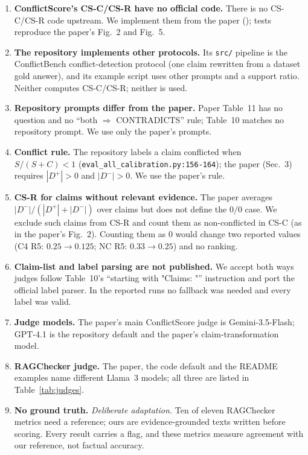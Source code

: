 \documentclass[11pt,a4paper]{article}
\newcommand{\code}[1]{\texttt{\detokenize{#1}}}
\DeclareRobustCommand{\src}[1]{{\small\nolinkurl{#1}}}
\begin{document}
\begin{enumerate}[label=\textbf{D\arabic*}, ref=D\arabic*, leftmargin=2.2em]
\item\label{d:cs-names} \textbf{ConflictScore's CS-C/CS-R have no official code.} There is no CS-C/CS-R code upstream. We implement them from the paper (\code{published_cs}); tests reproduce the paper's Fig.~2 and Fig.~5.
\item\label{d:cs-protocol} \textbf{The repository implements other protocols.} Its \src{src/} pipeline is the ConflictBench conflict-detection protocol (one claim rewritten from a dataset gold answer), and its example script uses other prompts and a support ratio. Neither computes CS-C/CS-R; neither is used.
\item\label{d:cs-prompts} \textbf{Repository prompts differ from the paper.} Paper Table~11 has no question and no ``both $\Rightarrow$ CONTRADICTS'' rule; Table~10 matches no repository prompt. We use only the paper's prompts.
\item\label{d:cs-conflict} \textbf{Conflict rule.} The repository labels a claim conflicted when $S/(S+C)<1$ (\src{eval_all_calibration.py:156-164}); the paper (Sec.~3) requires $|D^+|>0$ and $|D^-|>0$. We use the paper's rule.
\item\label{d:cs-irr} \textbf{CS-R for claims without relevant evidence.} The paper averages $|D^-|/(|D^+|+|D^-|)$ over claims but does not define the $0/0$ case. We exclude such claims from CS-R and count them as non-conflicted in CS-C (as in the paper's Fig.~2). Counting them as 0 would change two reported values (C4 R5: $0.25\to0.125$; NC R5: $0.33\to0.25$) and no ranking.
\item\label{d:cs-parse} \textbf{Claim-list and label parsing are not published.} We accept both ways judges follow Table~10's ``starting with "Claims: "'' instruction and port the official label parser. In the reported runs no fallback was needed and every label was valid.
\item\label{d:cs-label} \textbf{Judge models.} The paper's main ConflictScore judge is Gemini-3.5-Flash; GPT-4.1 is the repository default and the paper's claim-transformation model.
\item\label{d:rc-model} \textbf{RAGChecker judge.} The paper, the code default and the README examples name different Llama~3 models; all three are listed in Table~\ref{tab:judges}.
\item\label{d:rc-ref} \textbf{No ground truth.} \emph{Deliberate adaptation.} Ten of eleven RAGChecker metrics need a reference; ours are evidence-grounded texts written before scoring. Every result carries a \code{reference_dependent} flag, and these metrics measure agreement with our reference, not factual accuracy.

\end{enumerate}
\end{document}
